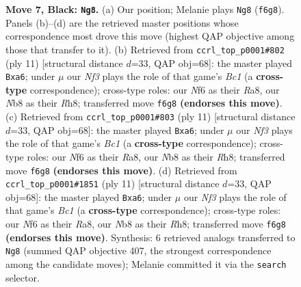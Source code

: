 \documentclass[11pt]{article}
\begin{document}
\begin{figure}[p]
\caption{\textbf{Move 7, Black: \texttt{Ng8}.} (a) Our position; Melanie plays \texttt{Ng8} (\texttt{f6g8}). Panels (b)--(d) are the retrieved master positions whose correspondence most drove this move (highest QAP objective among those that transfer to it). (b) Retrieved from \texttt{ccrl\_top\_p0001\#802} (ply 11) [structural distance $d$=33, QAP obj=68]: the master played \texttt{Bxa6}; under $\mu$ our \emph{Nf3} plays the role of that game's \emph{Bc1} (a \textbf{cross-type} correspondence); cross-type roles: our \emph{N}f6 as their \emph{R}a8, our \emph{N}b8 as their \emph{R}h8; transferred move \texttt{f6g8} \textbf{(endorses this move)}. (c) Retrieved from \texttt{ccrl\_top\_p0001\#803} (ply 11) [structural distance $d$=33, QAP obj=68]: the master played \texttt{Bxa6}; under $\mu$ our \emph{Nf3} plays the role of that game's \emph{Bc1} (a \textbf{cross-type} correspondence); cross-type roles: our \emph{N}f6 as their \emph{R}a8, our \emph{N}b8 as their \emph{R}h8; transferred move \texttt{f6g8} \textbf{(endorses this move)}. (d) Retrieved from \texttt{ccrl\_top\_p0001\#1851} (ply 11) [structural distance $d$=33, QAP obj=68]: the master played \texttt{Bxa6}; under $\mu$ our \emph{Nf3} plays the role of that game's \emph{Bc1} (a \textbf{cross-type} correspondence); cross-type roles: our \emph{N}f6 as their \emph{R}a8, our \emph{N}b8 as their \emph{R}h8; transferred move \texttt{f6g8} \textbf{(endorses this move)}. Synthesis: 6 retrieved analogs transferred to \texttt{Ng8} (summed QAP objective 407, the strongest correspondence among the candidate moves); Melanie committed it via the \texttt{search} selector.}
\label{fig:thought-m13}
\end{figure}

\clearpage
\end{document}

